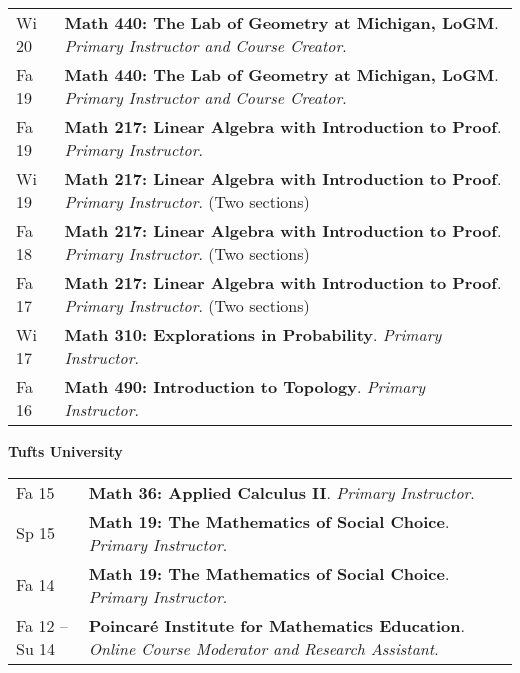     \begin{center}
    {
    \renewcommand{\arraystretch}{1.2}
    \begin{longtable}{p{}  p{}}
      Wi 20 & \textbf{{\normalfont Math 440:} The Lab of Geometry at Michigan, LoGM}. \textit{Primary Instructor and Course Creator}.  \\ 
  Fa 19 & \textbf{{\normalfont Math 440:} The Lab of Geometry at Michigan, LoGM}. \textit{Primary Instructor and Course Creator}.  \\ 
  Fa 19 & \textbf{{\normalfont Math 217:} Linear Algebra with Introduction to Proof}. \textit{Primary Instructor}.  \\ 
  Wi 19 & \textbf{{\normalfont Math 217:} Linear Algebra with Introduction to Proof}. \textit{Primary Instructor}. (Two sections) \\ 
  Fa 18 & \textbf{{\normalfont Math 217:} Linear Algebra with Introduction to Proof}. \textit{Primary Instructor}. (Two sections) \\ 
  Fa 17 & \textbf{{\normalfont Math 217:} Linear Algebra with Introduction to Proof}. \textit{Primary Instructor}. (Two sections) \\ 
  Wi 17 & \textbf{{\normalfont Math 310:} Explorations in Probability}. \textit{Primary Instructor}.  \\ 
  Fa 16 & \textbf{{\normalfont Math 490:} Introduction to Topology}. \textit{Primary Instructor}.  
    \end{longtable}
    } 
    \end{center}

    \vspace{-1em}
    

    \textbf{\large Tufts University}
    
    \begin{center}
    {
    \renewcommand{\arraystretch}{1.2}
    \begin{longtable}{p{}  p{}}
      Fa 15 & \textbf{{\normalfont Math 36:} Applied Calculus II}. \textit{Primary Instructor}.  \\ 
  Sp 15 & \textbf{{\normalfont Math 19:} The Mathematics of Social Choice}. \textit{Primary Instructor}.  \\ 
  Fa 14 & \textbf{{\normalfont Math 19:} The Mathematics of Social Choice}. \textit{Primary Instructor}.  \\ 
  Fa 12 --   Su 14 & \textbf{Poincar\'e Institute for Mathematics Education}. \textit{Online Course Moderator and Research Assistant}.  
    \end{longtable}
    } 
    \end{center}

    \vspace{-1em}
    